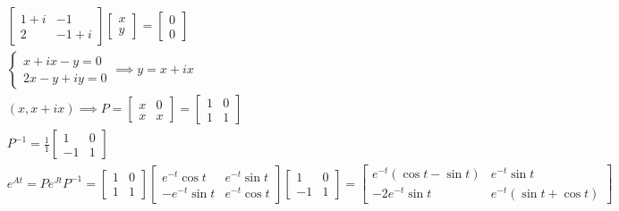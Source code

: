 \documentclass[a4paper,11pt]{article}
\begin{document}
\begin{align*}
&\begin{bmatrix}
1+i & -1 \\
2 & -1+i
\end{bmatrix}
\begin{bmatrix}
x \\
y
\end{bmatrix}
=
\begin{bmatrix}
0 \\
0
\end{bmatrix} \\
&\begin{cases}
x+ix-y=0 \\
2x-y+iy=0
\end{cases}
\implies
y=x+ix \\
& ( x , x+ix )
\implies
P = 
\begin{bmatrix}
x & 0 \\
x & x
\end{bmatrix}
=
\begin{bmatrix}
1 & 0 \\
1 & 1
\end{bmatrix} \\
&P^{-1}=\frac{1}{1}
\begin{bmatrix}
1 & 0 \\
-1 & 1 
\end{bmatrix} \\
&e^{At} = Pe^{Jt}P^{-1} = 
\begin{bmatrix}
1 & 0 \\
1 & 1
\end{bmatrix}
\begin{bmatrix}
e^{-t}\cos t & e^{-t}\sin t \\
-e^{-t}\sin t & e^{-t}\cos t
\end{bmatrix}
\begin{bmatrix}
1 & 0 \\
-1 & 1
\end{bmatrix}
=
\begin{bmatrix}
e^{-t}(\cos t - \sin t ) & e^{-t} \sin t \\
-2e^{-t}\sin t & e^{-t}(\sin t + \cos t )
\end{bmatrix}
\end{align*}
\end{document}

